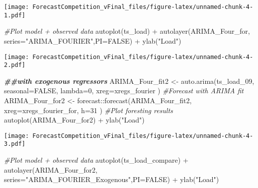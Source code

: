 \documentclass[
]{article}
\newenvironment{Shaded}{\begin{snugshade}}{\end{snugshade}}
\newcommand{\AttributeTok}[1]{\textcolor[rgb]{0.77,0.63,0.00}{#1}}
\newcommand{\CommentTok}[1]{\textcolor[rgb]{0.56,0.35,0.01}{\textit{#1}}}
\newcommand{\ConstantTok}[1]{\textcolor[rgb]{0.00,0.00,0.00}{#1}}
\newcommand{\DecValTok}[1]{\textcolor[rgb]{0.00,0.00,0.81}{#1}}
\newcommand{\DocumentationTok}[1]{\textcolor[rgb]{0.56,0.35,0.01}{\textbf{\textit{#1}}}}
\newcommand{\FunctionTok}[1]{\textcolor[rgb]{0.00,0.00,0.00}{#1}}
\newcommand{\NormalTok}[1]{#1}
\newcommand{\OtherTok}[1]{\textcolor[rgb]{0.56,0.35,0.01}{#1}}
\newcommand{\SpecialCharTok}[1]{\textcolor[rgb]{0.00,0.00,0.00}{#1}}
\newcommand{\StringTok}[1]{\textcolor[rgb]{0.31,0.60,0.02}{#1}}
\begin{document}
\texttt{[image: ForecastCompetition\_vFinal\_files/figure-latex/unnamed-chunk-4-1.pdf]}

\begin{Shaded}
\begin{Highlighting}[]
\CommentTok{\#Plot model + observed data}
\FunctionTok{autoplot}\NormalTok{(ts\_load) }\SpecialCharTok{+}
  \FunctionTok{autolayer}\NormalTok{(ARIMA\_Four\_for, }\AttributeTok{series=}\StringTok{"ARIMA\_FOURIER"}\NormalTok{,}\AttributeTok{PI=}\ConstantTok{FALSE}\NormalTok{) }\SpecialCharTok{+}
  \FunctionTok{ylab}\NormalTok{(}\StringTok{"Load"}\NormalTok{)}
\end{Highlighting}
\end{Shaded}

\texttt{[image: ForecastCompetition\_vFinal\_files/figure-latex/unnamed-chunk-4-2.pdf]}

\begin{Shaded}
\begin{Highlighting}[]
\DocumentationTok{\#\#with exogenous regressors }
\NormalTok{ARIMA\_Four\_fit2 }\OtherTok{\textless{}{-}} \FunctionTok{auto.arima}\NormalTok{(ts\_load\_09, }
                             \AttributeTok{seasonal=}\ConstantTok{FALSE}\NormalTok{, }
                             \AttributeTok{lambda=}\DecValTok{0}\NormalTok{,}
                             \AttributeTok{xreg=}\NormalTok{xregs\_fourier}
\NormalTok{                             )}
\CommentTok{\#Forecast with ARIMA fit}
\NormalTok{ARIMA\_Four\_for2 }\OtherTok{\textless{}{-}}\NormalTok{ forecast}\SpecialCharTok{::}\FunctionTok{forecast}\NormalTok{(ARIMA\_Four\_fit2,}
                                     \AttributeTok{xreg=}\NormalTok{xregs\_fourier\_for,}
                           \AttributeTok{h=}\DecValTok{31}
\NormalTok{                           ) }
\CommentTok{\#Plot foresting results}
\FunctionTok{autoplot}\NormalTok{(ARIMA\_Four\_for2) }\SpecialCharTok{+} \FunctionTok{ylab}\NormalTok{(}\StringTok{"Load"}\NormalTok{)}
\end{Highlighting}
\end{Shaded}

\texttt{[image: ForecastCompetition\_vFinal\_files/figure-latex/unnamed-chunk-4-3.pdf]}

\begin{Shaded}
\begin{Highlighting}[]
\CommentTok{\#Plot model + observed data}
\FunctionTok{autoplot}\NormalTok{(ts\_load\_compare) }\SpecialCharTok{+}
  \FunctionTok{autolayer}\NormalTok{(ARIMA\_Four\_for2, }\AttributeTok{series=}\StringTok{"ARIMA\_FOURIER\_Exogenous"}\NormalTok{,}\AttributeTok{PI=}\ConstantTok{FALSE}\NormalTok{) }\SpecialCharTok{+}
  \FunctionTok{ylab}\NormalTok{(}\StringTok{"Load"}\NormalTok{)}
\end{Highlighting}
\end{Shaded}
\end{document}
